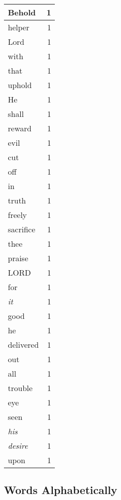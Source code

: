 \begin{center}
\begin{longtable}{l|r}
Behold & 1 \\ \hline
helper & 1 \\ \hline
Lord & 1 \\ \hline
with & 1 \\ \hline
that & 1 \\ \hline
uphold & 1 \\ \hline
He & 1 \\ \hline
shall & 1 \\ \hline
reward & 1 \\ \hline
evil & 1 \\ \hline
cut & 1 \\ \hline
off & 1 \\ \hline
in & 1 \\ \hline
truth & 1 \\ \hline
freely & 1 \\ \hline
sacrifice & 1 \\ \hline
thee & 1 \\ \hline
praise & 1 \\ \hline
LORD & 1 \\ \hline
for & 1 \\ \hline
\emph{it} & 1 \\ \hline
good & 1 \\ \hline
he & 1 \\ \hline
delivered & 1 \\ \hline
out & 1 \\ \hline
all & 1 \\ \hline
trouble & 1 \\ \hline
eye & 1 \\ \hline
seen & 1 \\ \hline
\emph{his} & 1 \\ \hline
\emph{desire} & 1 \\ \hline
upon & 1 \\ \hline
\end{longtable}
\end{center}



\normalsize



\subsection{Words Alphabetically}

